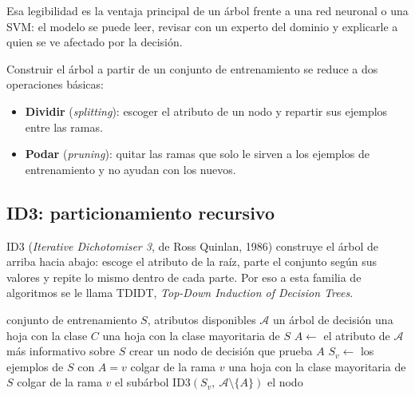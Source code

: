 \documentclass[11pt,letterpaper]{article}
\begin{document}
\begin{idea}
    Esa legibilidad es la ventaja principal de un árbol frente a una
    red neuronal o una SVM: el modelo se puede leer, revisar con un
    experto del dominio y explicarle a quien se ve afectado por la
    decisión.
\end{idea}

Construir el árbol a partir de un conjunto de entrenamiento se reduce
a dos operaciones básicas:

\begin{itemize}[itemsep=0.3em]
    \item \textbf{Dividir} (\textit{splitting}): escoger el atributo de
          un nodo y repartir sus ejemplos entre las ramas.
    \item \textbf{Podar} (\textit{pruning}): quitar las ramas que solo
          le sirven a los ejemplos de entrenamiento y no ayudan con los
          nuevos.
\end{itemize}


\subsection*{ID3: particionamiento recursivo}

ID3 (\textit{Iterative Dichotomiser 3}, de Ross Quinlan, 1986) construye
el árbol de arriba hacia abajo: escoge el atributo de la raíz, parte el
conjunto según sus valores y repite lo mismo dentro de cada parte. Por
eso a esta familia de algoritmos se le llama TDIDT, \textit{Top-Down
Induction of Decision Trees}.

\begin{algorithm}[H]
\caption{ID3$(S, \mathcal{A})$}
\begin{algorithmic}[1]
\Require conjunto de entrenamiento $S$, atributos disponibles
         $\mathcal{A}$
\Ensure un árbol de decisión
  \State \Return una hoja con la clase $C$
\EndIf
{}
  \State \Return una hoja con la clase mayoritaria de $S$
\EndIf
\State $A \gets$ el atributo de $\mathcal{A}$ más informativo sobre $S$
\State crear un nodo de decisión que prueba $A$
  \State $S_v \gets$ los ejemplos de $S$ con $A = v$
    \State colgar de la rama $v$ una hoja con la clase mayoritaria de
           $S$
  \Else
    \State colgar de la rama $v$ el subárbol
           ID3$(S_v,\ \mathcal{A} \setminus \{A\})$
  \EndIf
\EndFor
\State \Return el nodo
\end{algorithmic}
\end{algorithm}
\end{document}
